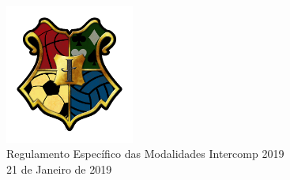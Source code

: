 \begin{center}

	\vspace*{\fill}
	{\let\clearpage\relax \includegraphics[width=120pt]{../logo-inter019.png} \\ [.5cm]}
	\Huge{Regulamento Específico das Modalidades Intercomp 2019} \\ [.5cm]
	\normalsize{21 de Janeiro de 2019}
	\vspace*{\fill}

\end{center}

